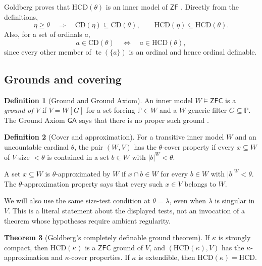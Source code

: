 \documentclass[11pt,letterpaper]{article}
\theoremstyle{definition}
\newtheorem{definition}{Definition}[section]
\newtheorem{theorem}[definition]{Theorem}
\newcommand{\ZFC}{\mathsf{ZFC}}
\newcommand{\ZF}{\mathsf{ZF}}
\newcommand{\CD}{\mathrm{CD}}
\newcommand{\HCD}{\mathrm{HCD}}
\newcommand{\GA}{\mathsf{GA}}
\newcommand{\tc}{\operatorname{tc}}
\begin{document}
Goldberg proves that $\HCD(\theta)$ is an inner model of $\ZF$ \cite[Propositions 4.2--4.3]{uniqueness}. Directly from the definitions,
\begin{equation}\label{eq:monotone}
 \eta\geq\theta\quad\Longrightarrow\quad
 \CD(\eta)\subseteq\CD(\theta),\qquad
 \HCD(\eta)\subseteq\HCD(\theta).
\end{equation}
Also, for a set of ordinals $a$,
\begin{equation}\label{eq:ordinalset}
       a\in\CD(\theta)\quad\Longleftrightarrow\quad a\in\HCD(\theta),
\end{equation}
since every other member of $\tc(\{a\})$ is an ordinal and hence ordinal definable.

\subsection{Grounds and covering}

\begin{definition}[Ground and Ground Axiom]
An inner model $W\models\ZFC$ is a \emph{ground of $V$} if $V=W[G]$ for a set forcing $\mathbb P\in W$ and a $W$-generic filter $G\subseteq\mathbb P$. The Ground Axiom $\GA$ says that there is no proper such ground \cite{reitz}.
\end{definition}

\begin{definition}[Cover and approximation]
For a transitive inner model $W$ and an uncountable cardinal $\theta$, the pair $(W,V)$ has the $\theta$-cover property if every $x\subseteq W$ of $V$-size $<\theta$ is contained in a set $b\in W$ with $|b|^W<\theta$.

A set $x\subseteq W$ is $\theta$-approximated by $W$ if $x\cap b\in W$ for every $b\in W$ with $|b|^W<\theta$. The $\theta$-approximation property says that every such $x\in V$ belongs to $W$.
\end{definition}

We will also use the same size-test condition at $\theta=\lambda$, even when $\lambda$ is singular in $V$. This is a literal statement about the displayed tests, not an invocation of a theorem whose hypotheses require ambient regularity.

\begin{theorem}[Goldberg's completely definable ground theorem]\label{input:ground}
If $\kappa$ is strongly compact, then $\HCD(\kappa)$ is a $\ZFC$ ground of $V$, and $(\HCD(\kappa),V)$ has the $\kappa$-approximation and $\kappa$-cover properties. If $\kappa$ is extendible, then $\HCD(\kappa)=\HCD$.
\end{theorem}
\end{document}
